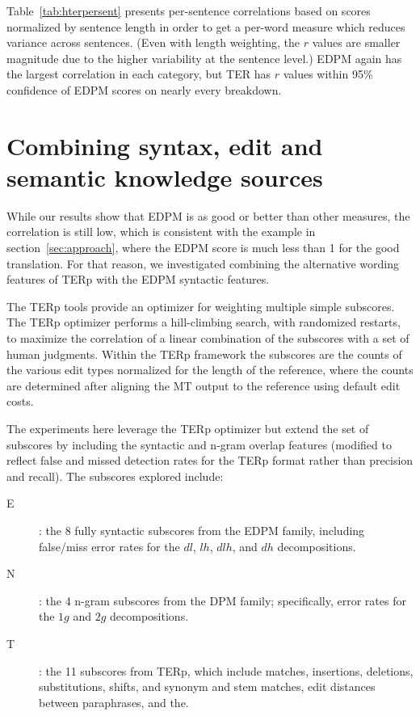\documentclass{kluwer}    %
\begin{document}
\begin{article}
Table~\ref{tab:hterpersent} presents per-sentence correlations based on
scores normalized by sentence length in order to get a per-word measure which
reduces variance across sentences.  (Even with length weighting, the
$r$ values are smaller magnitude due to the higher variability at the
sentence level.)  EDPM again has the largest correlation in each
category, but TER has $r$ values within 95\%
confidence of EDPM scores on nearly every breakdown.

\section{Combining syntax, edit and semantic knowledge sources}
\label{sec:hter2}

While our results show that EDPM is as good or better than other
measures, the correlation is still low, which is consistent with
the example in section~\ref{sec:approach}, where the EDPM score is much less than 1 for the good
translation. For that
reason, we investigated combining the alternative wording features of
TERp with the EDPM syntactic features.

The TERp tools \cite{snover09terp} provide an optimizer for
weighting multiple simple subscores.  The TERp optimizer performs a
hill-climbing search, with randomized restarts, to maximize the
correlation of a linear combination of the subscores with a set of
human judgments.  Within the TERp framework the subscores are the
counts of the various edit types normalized for the length of the
reference, where the counts are determined after aligning the MT
output to the reference using default edit costs.

The experiments here leverage the TERp optimizer but extend
the set of subscores by including the syntactic and n-gram overlap
features (modified to reflect false and missed detection rates for the TERp
format rather than precision and recall). The subscores explored include:
\begin{description}
\item[E]: the 8 fully syntactic subscores from the EDPM family, including
  false/miss error rates for the $dl$, $lh$, $dlh$, and $dh$ decompositions. 
\item[N]: the 4 n-gram subscores from the DPM family;
  specifically, error rates for the $1g$ and $2g$ decompositions.
\item[T]: the 11 subscores from TERp, which include matches, insertions, deletions, substitutions, shifts, and
  synonym and stem matches, edit distances between paraphrases, and the. 
\end{description}


\end{article}
\end{document}
